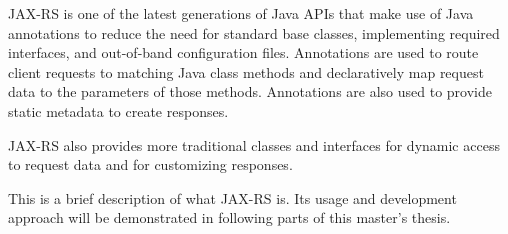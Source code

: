 	JAX-RS is one of the latest generations of Java APIs that make use of Java annotations to reduce the need for standard
	base classes, implementing required interfaces, and out-of-band configuration files. Annotations are used to route
	client requests to matching Java class methods and declaratively map request data to the parameters of those methods.
	Annotations are also used to provide static metadata to create responses.
	
	JAX-RS also provides more traditional classes and interfaces for dynamic access to request data and for customizing
	responses.
	
	This is a brief description of what JAX-RS is. Its usage and development approach will be demonstrated in following
	parts of this master's thesis.
